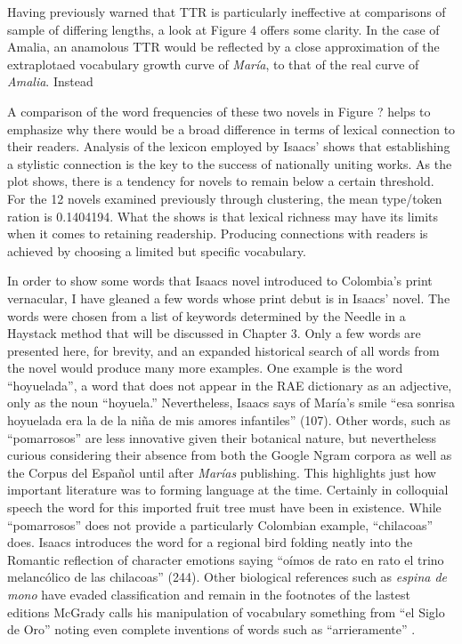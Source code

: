 \documentclass[12pt]{report}
\begin{document}
Having previously warned that TTR is particularly ineffective at comparisons of sample of differing lengths, a look at Figure 4 offers some clarity.
In the case of Amalia, an anamolous TTR would be reflected by a close approximation of the extraplotaed vocabulary growth curve of \textit{María}, to that of the real curve of \textit{Amalia}.
Instead 

A comparison of the word frequencies of these two novels in Figure ? helps to emphasize why there would be a broad difference in terms of lexical connection to their readers.
Analysis of the lexicon employed by Isaacs' shows that establishing a stylistic connection is the key to the success of nationally uniting works. 
As the plot shows, there is a tendency for novels to remain below a certain threshold.
For the 12 novels examined previously through clustering, the mean type/token ration is 0.1404194.
What the shows is that lexical richness may have its limits when it comes to retaining readership. 
Producing connections with readers is achieved by choosing a limited but specific vocabulary.


In order to show some words that Isaacs novel introduced to Colombia's print vernacular, I have gleaned a few words whose print debut is in Isaacs’ novel.
The words were chosen from a list of keywords determined by the Needle in a Haystack method that will be discussed in Chapter 3.
Only a few words are presented here, for brevity, and an expanded historical search of all words from the novel would produce many more examples.
One example is the word \enquote{hoyuelada}, a word that does not appear in the RAE dictionary as an adjective, only as the noun \enquote{hoyuela.}
Nevertheless, Isaacs says of María’s smile \enquote{esa sonrisa hoyuelada era la de la niña de mis amores infantiles} (107).
Other words, such as \enquote{pomarrosos} are less innovative given their botanical nature, but nevertheless curious considering their absence from both the Google Ngram corpora as well as the Corpus del Español until after \textit{Marías} publishing.
This highlights just how important literature was to forming language at the time.
Certainly in colloquial speech the word for this imported fruit tree must have been in existence.
While \enquote{pomarrosos} does not provide a particularly Colombian example, \enquote{chilacoas} does.
Isaacs introduces the word for a regional bird folding neatly into the Romantic reflection of character emotions saying \enquote{oímos de rato en rato el trino melancólico de las chilacoas} (244).
Other biological references such as \textit{espina de mono} have evaded classification and remain in the footnotes of the lastest editions
McGrady calls his manipulation of vocabulary something from \enquote{el Siglo de Oro} noting even complete inventions of words such as \enquote{arrieramente} \autocite[43]{McGrady2012}.
\end{document}

